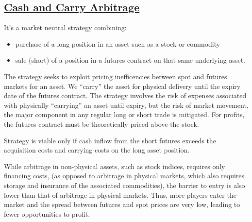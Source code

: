 \documentclass{article}
\begin{document}
\subsection{\href{https://www.investopedia.com/terms/c/cash-and-carry-arbitrage.asp}{Cash and Carry Arbitrage}}
It's a market neutral strategy combining:
\begin{itemize}
    \item purchase of a long position in an asset such as a stock or commodity
    \item sale (short) of a position in a futures contract on that same underlying asset.
\end{itemize}
The strategy seeks to exploit pricing inefficencies between spot and futures markets for an asset.
We ``carry'' the asset for physical delivery until the expiry date of the futures contract.
The strategy involves the risk of expenses associated with physically ``carrying'' an asset until expiry, but
the risk of market movement, the major component in any regular long or short trade is mitigated.
For profits, the futures contract must be theoretically priced above the stock.
\begin{center}
\begin{framed}
    Strategy is viable only if cash inflow from the short futures exceeds the acquisition costs
    and carrying costs on the long asset position.
\end{framed}
While arbitrage in non-physical assets, such as stock indices, requires only financing costs,
(as opposed to arbitrage in physical markets, which also requires storage and insurance of the 
associated commodities), the barrier to entry is also lower than that of arbitrage in physical
markets. Thus, more players enter the market and the spread between futures and spot prices
are very low, leading to fewer opportunities to profit.

\end{center}
\end{document}

